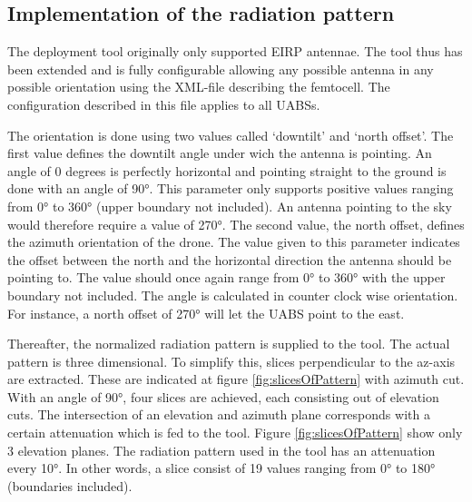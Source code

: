 \subsection{Implementation of the radiation pattern}
\label{subsec:implementationradpat}
The deployment tool originally only supported EIRP antennae. The tool thus has been extended and is fully configurable allowing any possible antenna in any possible 
orientation using the XML-file describing the femtocell. The configuration described in this file applies to all \gls{UABS}s. 

The orientation is done using two values called `downtilt' and `north offset'. The first value
defines the downtilt angle under wich the antenna is pointing. An angle of 0 degrees is perfectly horizontal and pointing straight to the ground is done with an angle of \ang{90}.
This parameter only supports positive values ranging from \ang{0} to \ang{360} (upper boundary not included). An antenna pointing to the sky would therefore require a value of \ang{270}.
The second value, the north offset, defines the azimuth orientation of the drone. The value given to this parameter indicates the offset between the north
and the horizontal direction the antenna should be pointing to. The value should once again range from \ang{0} to \ang{360} with the upper boundary not included. The
angle is calculated in counter clock wise orientation. For instance, a north offset of \ang{270} will let the \gls{UABS} point to the east.  

Thereafter, the normalized radiation pattern is supplied to the tool. The actual pattern is three dimensional. To simplify this,
slices perpendicular to the az-axis are extracted. These are indicated at figure \ref{fig:slicesOfPattern} with azimuth cut. With
an angle of \ang{90}, four slices are achieved, each consisting out of elevation cuts. The intersection of an elevation and azimuth plane 
corresponds with a certain attenuation which is fed to the tool. Figure \ref{fig:slicesOfPattern} show only 3 elevation planes. The radiation pattern used in the tool 
has an attenuation every \ang{10}. In other words, a slice consist of 19 values ranging from \ang{0} to \ang{180} (boundaries included).

